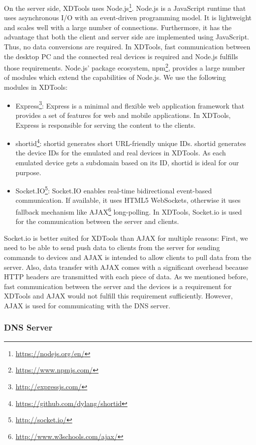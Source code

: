 On the server side, XDTools uses Node.js\footnote{\url{https://nodejs.org/en/}}. Node.js is a JavaScript runtime that uses asynchronous I/O with an event-driven programming model. It is lightweight and scales well with a large number of connections. Furthermore, it has the advantage that both the client and server side are implemented using JavaScript. Thus, no data conversions are required. In XDTools, fast communication between the desktop PC and the connected real devices is required and Node.js fulfills those requirements. Node.js' package ecosystem, npm\footnote{\url{https://www.npmjs.com/}}, provides a large number of modules which extend the capabilities of Node.js. We use the following modules in XDTools: 
\begin{itemize}
	\item Express\footnote{\url{http://expressjs.com/}}: Express is a minimal and flexible web application framework that provides a set of features for web and mobile applications. In XDTools, Express is responsible for serving the content to the clients.
	\item shortid\footnote{\url{https://github.com/dylang/shortid}}: shortid generates short URL-friendly unique IDs. shortid generates the device IDs for the emulated and real devices in XDTools. As each emulated device gets a subdomain based on its ID, shortid is ideal for our purpose.
	\item Socket.IO\footnote{\url{http://socket.io/}}: Socket.IO enables real-time bidirectional event-based communication. If available, it uses HTML5 WebSockets, otherwise it uses fallback mechanism like AJAX\footnote{\url{http://www.w3schools.com/ajax/}} long-polling. In XDTools, Socket.io is used for the communication between the server and clients.
\end{itemize}

Socket.io is better suited for XDTools than AJAX for multiple reasons: First, we need to be able to send push data to clients from the server for sending commands to devices and AJAX is intended to allow clients to pull data from the server. Also, data transfer with AJAX comes with a significant overhead because HTTP headers are transmitted with each piece of data. As we mentioned before, fast communication between the server and the devices is a requirement for XDTools and AJAX would not fulfill this requirement sufficiently. However, AJAX is used for communicating with the DNS server.

\subsubsection{DNS Server}

